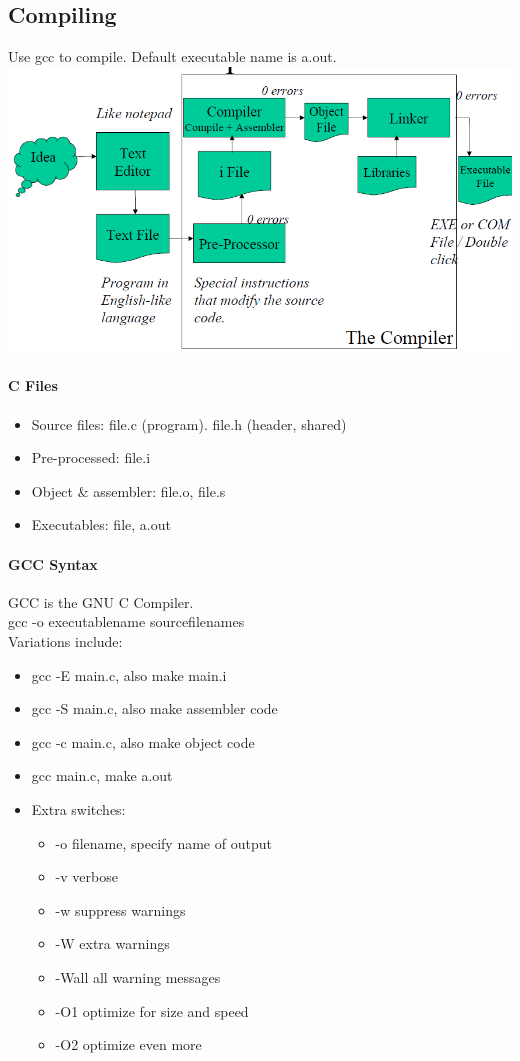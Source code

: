 \documentclass[12 pt]{article}
\begin{document}
\subsection{Compiling} Use gcc to compile. Default executable name is a.out.
\\ \includegraphics[scale=0.5]{cco}
\paragraph{C Files}
\begin{itemize}
	\item Source files: file.c (program). file.h (header, shared)
	\item Pre-processed: file.i
	\item Object \& assembler: file.o, file.s
	\item Executables: file, a.out
	\end{itemize}
\paragraph{GCC Syntax}
GCC is the GNU C Compiler.
\\ gcc -o executablename sourcefilenames
\\ Variations include:
\begin{itemize}
	\item gcc -E main.c, also make main.i
	\item gcc -S main.c, also make assembler code
	\item gcc -c main.c, also make object code
	\item gcc main.c, make a.out
	\item Extra switches:
	\begin{itemize}
		\item -o filename, specify name of output
		\item -v verbose
		\item -w suppress warnings
		\item -W extra warnings
		\item -Wall all warning messages
		\item -O1 optimize for size and speed
		\item -O2 optimize even more
	\end{itemize}
\end{itemize}
\end{document}
